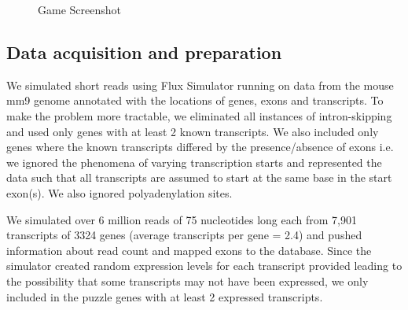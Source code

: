 \documentclass[12pt]{article}
\begin{document}
\begin{figure}[H]
\centering
{} 
\caption{Game Screenshot}\label{fig:gamescreen}
\end{figure}

\subsection*{Data acquisition and preparation}
We simulated short reads using Flux Simulator \citep{sammeth2010flux} running on data from the mouse mm9 genome annotated with the locations of genes, exons and transcripts. To make the problem more tractable, we eliminated all instances of intron-skipping and used only genes with at least 2 known transcripts. We also included only genes where the known transcripts differed by the presence/absence of exons i.e. we ignored the phenomena of varying transcription starts and represented the data such that all transcripts are assumed to start at the same base in the start exon(s). We also ignored polyadenylation sites. 

We simulated over 6 million reads of 75 nucleotides long each from 7,901 transcripts of 3324 genes (average transcripts per gene = 2.4) and pushed information about read count and mapped exons to the database. Since the simulator created random expression levels for each transcript provided leading to the possibility that some transcripts may not have been expressed, we only included in the puzzle genes with at least 2 expressed transcripts.
\end{document}
